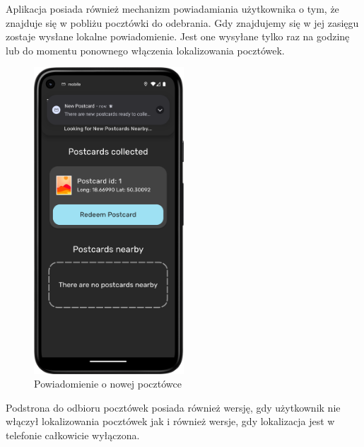 \documentclass[a4paper,twoside,12pt]{book}
\begin{document}
Aplikacja posiada również mechanizm powiadamiania użytkownika o tym, że znajduje się w pobliżu pocztówki do odebrania. Gdy znajdujemy się w jej zasięgu zostaje wysłane lokalne powiadomienie. Jest one wysyłane tylko raz na godzinę lub do momentu ponownego włączenia lokalizowania pocztówek.

\begin{figure}[H]
    \centering
    \includegraphics[width=0.5\textwidth]{mobile_ss/powiadomienie.png}
    \caption{Powiadomienie o nowej pocztówce}
\end{figure}

Podstrona do odbioru pocztówek posiada również wersję, gdy użytkownik nie włączył lokalizowania pocztówek jak i również wersje, gdy lokalizacja jest w telefonie całkowicie wyłączona.
\end{document}
